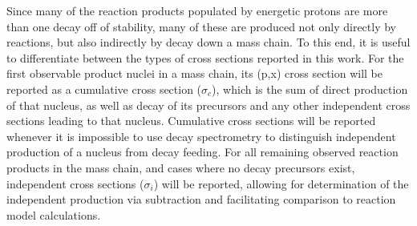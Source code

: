 Since many of the reaction products populated by energetic protons are more than one decay off of stability, many of these are produced not only  directly by reactions, but also indirectly by decay down a mass chain.
To this end, it is useful to differentiate between the types of cross sections reported in this work. 
For the first observable product nuclei in a mass chain, its (p,x) cross section will be reported as a cumulative cross section ($\sigma_c$), which is the sum of direct production of that nucleus, as well as decay of its  precursors and any other independent cross sections leading to that nucleus. 
Cumulative cross sections will be reported whenever it is impossible to use decay spectrometry to distinguish independent production of a nucleus from decay feeding.
For all remaining observed reaction products in the mass chain, and cases where no decay precursors exist, independent cross sections ($\sigma_i$) will be reported, allowing for determination of the independent production via subtraction  and facilitating comparison to reaction model calculations.  



